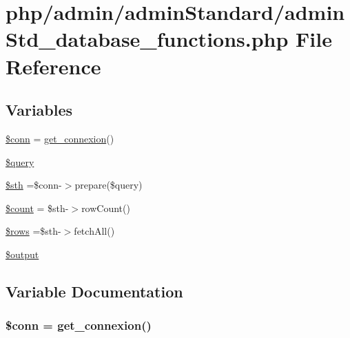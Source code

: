 \hypertarget{admin_std__database__functions_8php}{\section{php/admin/admin\-Standard/admin\-Std\-\_\-database\-\_\-functions.php File Reference}
\label{admin_std__database__functions_8php}
}
\subsection*{Variables}
\begin{DoxyCompactItemize}
\item 
\hyperlink{admin_std__database__functions_8php_aa8a5a87b9c1a6a0819b88447cbe41877}{\$conn} = \hyperlink{php__functions_8php_ace18bc10f3fd08f92688ac743e0d8c2e}{get\-\_\-connexion}()
\item 
\hyperlink{admin_std__database__functions_8php_af59a5f7cd609e592c41dc3643efd3c98}{\$query}
\item 
\hyperlink{admin_std__database__functions_8php_afa9126f9664959c02795be300a135f93}{\$sth} =\$conn-\/$>$prepare(\$query)
\item 
\hyperlink{admin_std__database__functions_8php_af789423037bbc89dc7c850e761177570}{\$count} = \$sth-\/$>$row\-Count()
\item 
\hyperlink{admin_std__database__functions_8php_ace2ec39e7df3899fa8df9640ec274b03}{\$rows} =\$sth-\/$>$fetch\-All()
\item 
\hyperlink{admin_std__database__functions_8php_a73004ce9cd673c1bfafd1dc351134797}{\$output}
\end{DoxyCompactItemize}


\subsection{Variable Documentation}
\hypertarget{admin_std__database__functions_8php_aa8a5a87b9c1a6a0819b88447cbe41877}{
\subsubsection[{\$conn}]{\setlength{\rightskip}{0pt plus 5cm}\$conn = {\bf get\-\_\-connexion}()}}\label{admin_std__database__functions_8php_aa8a5a87b9c1a6a0819b88447cbe41877}


